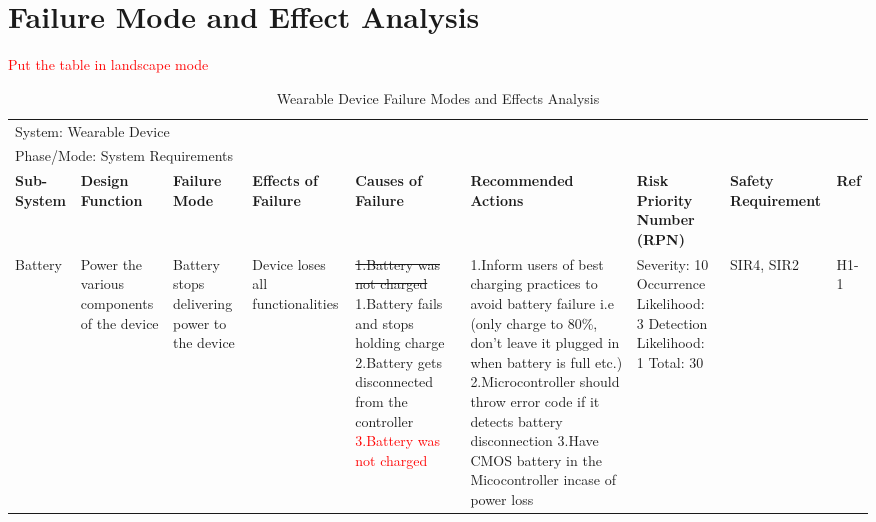 \documentclass[12pt, titlepage]{article}
\begin{document}
\section{Failure Mode and Effect Analysis}
\textcolor{red}{Put the table in landscape mode}

\begin{landscape}
\begin{table}[H]
\centering
    \caption{Wearable Device Failure Modes and Effects Analysis}
	
    \begin{tabular}{| p{} | p{}  | p{} | p{} | p{} | p{} | p{} | p{} | p{} |}
    \hline
    
    \multicolumn{9}{|l|}{System: Wearable Device} \\
    \multicolumn{9}{|l|}{Phase/Mode: System Requirements} \\ \hline
    \textbf{Sub-System} & \textbf{Design Function} & \textbf{Failure Mode} & \textbf{Effects of Failure} & \textbf{Causes of Failure} & \textbf{Recommended Actions} & \textbf{Risk Priority Number (RPN)} & \textbf{Safety Requirement} & \textbf{Ref} \\ \hline

    Battery & Power the various components of the device  & Battery stops delivering power to the device & Device loses all functionalities & \sout{1.Battery was not charged} \newline 1.Battery fails and stops holding charge \newline 2.Battery gets disconnected from the controller \newline \textcolor{red}{3.Battery was not charged} & 1.Inform users of best charging practices to avoid battery failure i.e (only charge to 80\%, don't leave it plugged in when battery is full etc.) \newline 2.Microcontroller should throw error code if it detects battery disconnection \newline 3.Have CMOS battery in the Micocontroller incase of power loss & Severity: 10 \newline Occurrence Likelihood: 3 \newline Detection Likelihood: 1 \newline Total: 30 & SIR4, SIR2 & H1-1 \\ \cline{1-9}
    
    \end{tabular}


\end{table}
\end{landscape}
\end{document}
